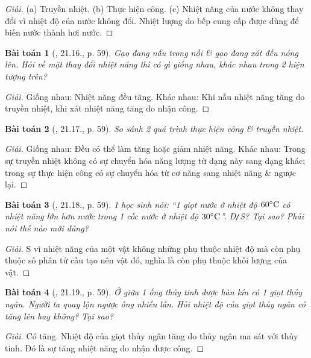 \documentclass{article}
\newtheorem{baitoan}{Bài toán}
\begin{document}
\begin{proof}[Giải]
	(a) Truyền nhiệt. (b) Thực hiện công. (c) Nhiệt năng của nước không thay đổi vì nhiệt độ của nước không đổi. Nhiệt lượng do bếp cung cấp được dùng để biến nước thành hơi nước.
\end{proof}

\begin{baitoan}[\cite{SBT_Vat_Ly_8}, 21.16., p. 59]
	Gạo đang nấu trong nồi \& gạo đang xát đều nóng lên. Hỏi về mặt thay đổi nhiệt năng thì có gì giống nhau, khác nhau trong 2 hiện tượng trên?
\end{baitoan}

\begin{proof}[Giải]
	Giống nhau: Nhiệt năng đều tăng. Khác nhau: Khi nấu nhiệt năng tăng do truyền nhiệt, khi xát nhiệt năng tăng do nhận công.
\end{proof}

\begin{baitoan}[\cite{SBT_Vat_Ly_8}, 21.17., p. 59]
	So sánh 2 quá trình thực hiện công \& truyền nhiệt.
\end{baitoan}

\begin{proof}[Giải]
	Giống nhau: Đều có thể làm tăng hoặc giảm nhiệt năng. Khác nhau: Trong sự truyền nhiệt không có sự chuyển hóa năng lượng từ dạng này sang dạng khác; trong sự thực hiện công có sự chuyển hóa từ cơ năng sang nhiệt năng \& ngược lại.
\end{proof}

\begin{baitoan}[\cite{SBT_Vat_Ly_8}, 21.18., p. 59]
	1 học sinh nói: ``1 giọt nước ở nhiệt độ $60^\circ{\rm C}$ có nhiệt năng lớn hơn nước trong 1 cốc nước ở nhiệt độ $30^\circ{\rm C}$''. \emph{Đ\texttt{/}S?} Tại sao? Phải nói thế nào mới đúng?
\end{baitoan}

\begin{proof}[Giải]
	S vì nhiệt năng của một vật không những phụ thuộc nhiệt độ mà còn phụ thuộc số phân tử cấu tạo nên vật đó, nghĩa là còn phụ thuộc khối lượng của vật.
\end{proof}

\begin{baitoan}[\cite{SBT_Vat_Ly_8}, 21.19., p. 59]
	Ở giữa 1 ống thủy tinh được hàn kín có 1 giọt thủy ngân. Người ta quay lộn ngược ống nhiều lần. Hỏi nhiệt độ của giọt thủy ngân có tăng lên hay không? Tại sao?
\end{baitoan}

\begin{proof}[Giải]
	Có tăng. Nhiệt độ của giọt thủy ngân tăng do thủy ngân ma sát với thủy tinh. Đó là sự tăng nhiệt năng do nhận được công.
\end{proof}
\end{document}
